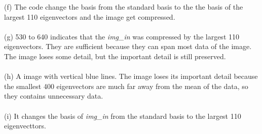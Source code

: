 \documentclass{article}
\begin{document}
\indent(f) The code change the basis from the standard basis to the the basis of the largest 110 eigenvectors and the image get compressed.
\\\\
\indent(g) 530 to 640 indicates that the \textit{img\_in} was compressed by the largest 110 eigenvectors. They are sufficient because they can span most data of the image. The image loses some detail, but the important detail is still preserved.
\\\\
\indent(h) A image with vertical blue lines. The image loses its important detail because the smallest 400 eigenvectors are much far away from the mean of the data, so they contains unnecessary data.
\\\\
\indent(i) It changes the basis of \textit{img\_in} from the standard basis to the largest 110 eigenvecttors.
\end{document}
